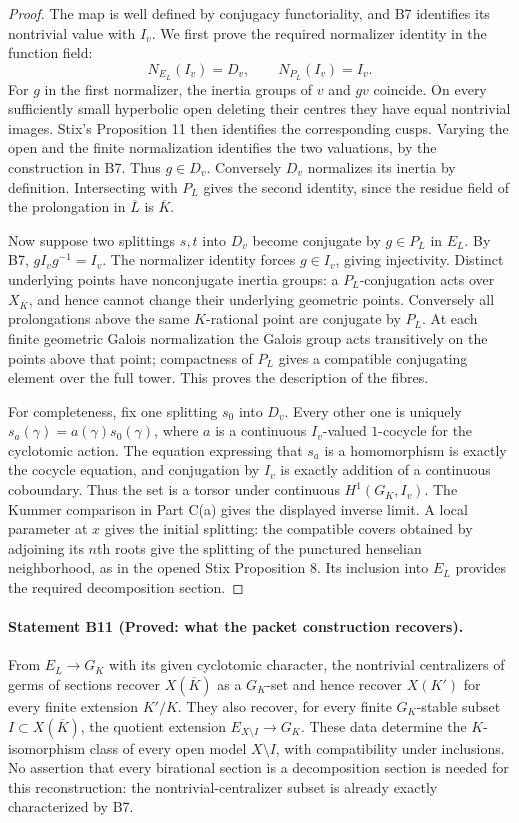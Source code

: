 \begin{proof}
The map is well defined by conjugacy functoriality, and B7 identifies
its nontrivial value with $I_v$. We first prove the required normalizer
identity in the function field:
\[
 N_{E_L}(I_v)=D_v,\qquad N_{P_L}(I_v)=I_v.
\]
For $g$ in the first normalizer, the inertia groups of $v$ and $gv$
coincide. On every sufficiently small hyperbolic open deleting their
centres they have equal nontrivial images. Stix's Proposition 11 then
identifies the corresponding cusps. Varying the open and the finite
normalization identifies the two valuations, by the construction in B7.
Thus $g\in D_v$. Conversely $D_v$ normalizes its inertia by definition.
Intersecting with $P_L$ gives the second identity, since the residue
field of the prolongation in $\overline L$ is $\overline K$.

Now suppose two splittings $s,t$ into $D_v$ become conjugate by
$g\in P_L$ in $E_L$. By B7, $gI_vg^{-1}=I_v$. The normalizer identity
forces $g\in I_v$, giving injectivity. Distinct underlying points have
nonconjugate inertia groups: a $P_L$-conjugation acts over
$X_{\overline K}$, and hence cannot change their underlying geometric
points. Conversely all prolongations above the same $K$-rational point
are conjugate by $P_L$. At each finite geometric Galois normalization the
Galois group acts transitively on the points above that point; compactness
of $P_L$ gives a compatible conjugating element over the full tower.
This proves the description of the fibres.

For completeness, fix one splitting $s_0$ into $D_v$. Every other one is
uniquely $s_a(\gamma)=a(\gamma)s_0(\gamma)$, where $a$ is a continuous
$I_v$-valued $1$-cocycle for the cyclotomic action. The equation expressing
that $s_a$ is a homomorphism is exactly the cocycle equation, and
conjugation by $I_v$ is exactly addition of a continuous coboundary.
Thus the set is a torsor under continuous $H^1(G_K,I_v)$. The Kummer
comparison in Part C(a) gives the displayed inverse limit. A local
parameter at $x$ gives the initial splitting: the compatible covers
obtained by adjoining its $n$th roots give the splitting of the punctured
henselian neighborhood, as in the opened Stix Proposition 8. Its
inclusion into $E_L$ provides the required decomposition section.
\end{proof}

\paragraph{Statement B11 (Proved: what the packet construction recovers).}\label{res:B11}
From $E_L\to G_K$ with its given cyclotomic character, the nontrivial
centralizers of germs of sections recover $X(\overline K)$ as a $G_K$-set
and hence recover $X(K')$ for every finite extension $K'/K$.
They also recover, for every finite $G_K$-stable subset
$I\subset X(\overline K)$, the quotient extension
$E_{X\setminus I}\to G_K$. These data determine the $K$-isomorphism
class of every open model $X\setminus I$, with compatibility under
inclusions. No assertion that every birational section is a decomposition
section is needed for this reconstruction: the nontrivial-centralizer
subset is already exactly characterized by B7.


